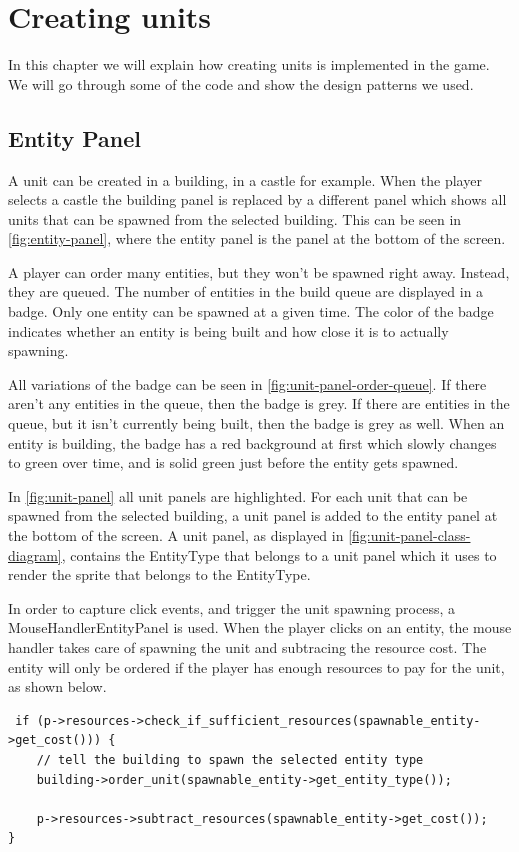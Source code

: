 \section{Creating units}
In this chapter we will explain how creating units is implemented in the game. We will go through some of the code and show the design patterns we used.

\subsection{Entity Panel} \label{EntityPanel}
A unit can be created in a building, in a castle for example. When the player selects a castle the building panel is replaced by a different panel which shows all units that can be spawned from the selected building. This can be seen in \cref{fig:entity-panel}, where the entity panel is the panel at the bottom of the screen. 

A player can order many entities, but they won't be spawned right away. Instead, they are queued. The number of entities in the build queue are displayed in a badge. Only one entity can be spawned at a given time. The color of the badge indicates whether an entity is being built and how close it is to actually spawning. 

All variations of the badge can be seen in \cref{fig:unit-panel-order-queue}. If there aren't any entities in the queue, then the badge is grey. If there are entities in the queue, but it isn't currently being built, then the badge is grey as well. When an entity is building, the badge has a red background at first which slowly changes to green over time, and is solid green just before the entity gets spawned.

In \cref{fig:unit-panel} all unit panels are highlighted. For each unit that can be spawned from the selected building, a unit panel is added to the entity panel at the bottom of the screen. A unit panel, as displayed in \cref{fig:unit-panel-class-diagram}, contains the EntityType that belongs to a unit panel which it uses to render the sprite that belongs to the EntityType.

In order to capture click events, and trigger the unit spawning process, a MouseHandlerEntityPanel is used. When the player clicks on an entity, the mouse handler takes care of spawning the unit and subtracing the resource cost. The entity will only be ordered if the player has enough resources to pay for the unit, as shown below.

\begin{lstlisting}
 if (p->resources->check_if_sufficient_resources(spawnable_entity->get_cost())) {
    // tell the building to spawn the selected entity type
    building->order_unit(spawnable_entity->get_entity_type());
    
    p->resources->subtract_resources(spawnable_entity->get_cost());
}
\end{lstlisting}


